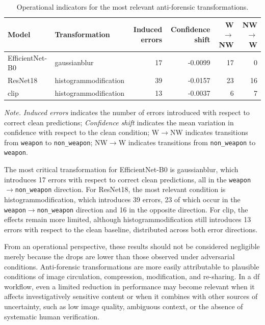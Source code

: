\begin{table}[H]
\centering
\scriptsize
\setlength{\tabcolsep}{4pt}
\renewcommand{\arraystretch}{1.15}
\caption{Operational indicators for the most relevant anti-forensic transformations.}
\label{tab:results-antiforensic-operational-errors}
\begin{tabular}{@{}l l r r r r@{}}
\toprule
\textbf{Model} &
\textbf{Transformation} &
\textbf{Induced errors} &
\textbf{Confidence shift} &
\textbf{W\(\rightarrow\)NW} &
\textbf{NW\(\rightarrow\)W} \\
\midrule
EfficientNet-B0 & \gls{gaussianblur} & 17 & -0.0099 & 17 & 0 \\
ResNet18 & \gls{histogrammodification} & 39 & -0.0157 & 23 & 16 \\
\acrshort{clip} & \gls{histogrammodification} & 13 & -0.0037 & 6 & 7 \\
\bottomrule
\end{tabular}

\vspace{0.4em}
\footnotesize
\textit{Note.} \textit{Induced errors} indicates the number of errors introduced
with respect to correct clean predictions; \textit{Confidence shift} indicates
the mean variation in confidence with respect to the clean condition;
W\(\rightarrow\)NW indicates transitions from \texttt{weapon} to
\texttt{non\_weapon}; NW\(\rightarrow\)W indicates transitions from
\texttt{non\_weapon} to \texttt{weapon}.
\end{table}

The most critical transformation for EfficientNet-B0 is \gls{gaussianblur},
which introduces 17 errors with respect to correct clean predictions, all in the
\texttt{weapon}\(\rightarrow\)\texttt{non\_weapon} direction. For ResNet18, the
most relevant condition is \gls{histogrammodification}, which introduces 39
errors, 23 of which occur in the
\texttt{weapon}\(\rightarrow\)\texttt{non\_weapon} direction and 16 in the
opposite direction. For \gls{clip}, the effects remain more limited, although
\gls{histogrammodification} still introduces 13 errors with respect to the clean
baseline, distributed across both error directions.

From an operational perspective, these results should not be considered
negligible merely because the drops are lower than those observed under
adversarial conditions. Anti-forensic transformations are more easily
attributable to plausible conditions of image circulation, compression,
modification, and re-sharing. In a \gls{df} workflow, even a limited reduction
in performance may become relevant when it affects investigatively sensitive
content or when it combines with other sources of uncertainty, such as low image
quality, ambiguous context, or the absence of systematic human verification.

